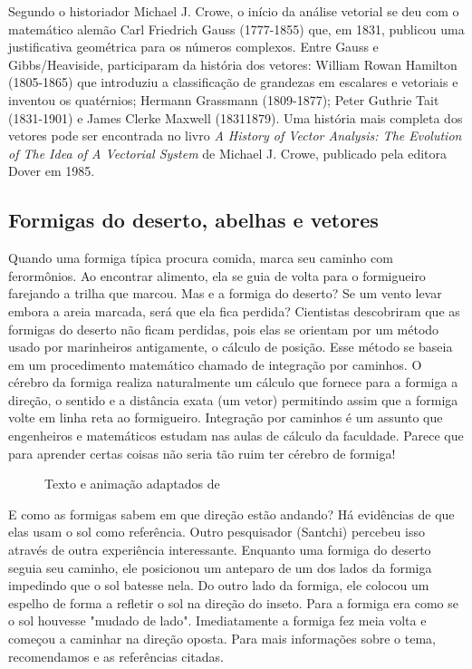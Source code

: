 Segundo o historiador Michael J. Crowe, o início da análise vetorial se deu com o matemático alemão Carl Friedrich Gauss (1777-1855) que, em 1831, publicou uma justificativa geométrica para os números complexos. Entre Gauss e Gibbs/Heaviside, participaram da história dos vetores: William Rowan Hamilton (1805-1865) que introduziu a classificação de grandezas em escalares e vetoriais e inventou os quatérnios; Hermann Grassmann (1809-1877); Peter Guthrie Tait (1831-1901) e James Clerke Maxwell (1831\textendash{}1879). Uma história mais completa dos vetores pode ser encontrada no livro \textit{A History of Vector Analysis: The Evolution of The Idea of A Vectorial System} de Michael J. Crowe, publicado pela editora Dover em 1985.


\subsection{Formigas do deserto, abelhas e vetores}
\label{\detokenize{GE101-E:formigas-do-deserto-abelhas-e-vetores}}
Quando uma formiga típica procura comida, marca seu caminho com ferormônios. Ao encontrar alimento, ela se guia de volta para o formigueiro farejando a trilha que marcou. Mas e a formiga do deserto? Se um vento levar embora a areia marcada, será que ela fica perdida? Cientistas \citet{wehner1981} descobriram que as formigas do deserto não ficam perdidas, pois elas se orientam por um método usado por marinheiros antigamente, o cálculo de posição. Esse método se baseia em um procedimento matemático chamado de integração por caminhos. O cérebro da formiga realiza naturalmente um cálculo que fornece para a formiga a direção, o sentido e a distância exata (um vetor) permitindo assim que a formiga volte em linha reta ao formigueiro. Integração por caminhos é um assunto que engenheiros e matemáticos estudam nas aulas de cálculo da faculdade. Parece que para aprender certas coisas não seria tão ruim ter cérebro de formiga!

\begin{figure}[H]
\centering
\capstart

\caption{Texto e animação adaptados de \citet{gomes2010}}\end{figure}

E como as formigas sabem em que direção estão andando? Há evidências de que elas usam o sol como referência. Outro pesquisador (Santchi) percebeu isso através de outra experiência interessante. Enquanto uma formiga do deserto seguia seu caminho, ele posicionou um anteparo de um dos lados da formiga impedindo que o sol batesse nela. Do outro lado da formiga, ele colocou um espelho de forma a refletir o sol na direção do inseto. Para a formiga era como se o sol houvesse "mudado de lado". Imediatamente a formiga fez meia volta e começou a caminhar na direção oposta. Para mais informações sobre o tema, recomendamos \citep{gomes2010} e as referências citadas.

